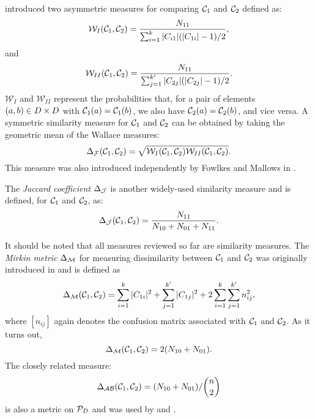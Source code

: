 \citet{wallace-1983} introduced two asymmetric measures for comparing
$\mathcal{C}_1$ and $\mathcal{C}_2$ defined as:
\begin{equation*}
  \mathcal{W}_{I}(\mathcal{C}_1,\mathcal{C}_2) =
  \frac{N_{11}}{\sum_{i=1}^{k} |C_{i1}|(|C_{1i}|-1)/2},
\end{equation*}
and
\begin{equation*}
  \mathcal{W}_{II}(\mathcal{C}_1,\mathcal{C}_2) =
  \frac{N_{11}}{\sum_{j=1}^{k'} |C_{2j}|(|C_{2j}|-1)/2}.
\end{equation*}
$\mathcal{W}_{I}$ and $\mathcal{W}_{II}$ represent the probabilities that, for
a pair of elements $(a,b) \in D \times D$ with
$\mathcal{C}_1(a)=\mathcal{C}_1(b)$, we also have $\mathcal{C}_2(a)=\mathcal{C}_2(b)$, and vice versa.
A symmetric similarity measure for $\mathcal{C}_1$ and $\mathcal{C}_2$ can be obtained by
taking the geometric mean of the Wallace measures:
\begin{equation*}
  \Delta_{\mathcal{F}}(\mathcal{C}_1,\mathcal{C}_2) = \sqrt{\mathcal{W}_{I}(\mathcal{C}_1,\mathcal{C}_2)
                          \mathcal{W}_{II}(\mathcal{C}_1,\mathcal{C}_2)}.
\end{equation*}
This measure was also introduced independently by Fowlkes and Mallows in
\citep{fowlkes-mallows-1983}.

The \textit{Jaccard coefficient} $\Delta_{\mathcal{J}}$ is another widely-used
similarity measure and is defined, for $\mathcal{C}_1$ and $\mathcal{C}_2$, as:
\begin{equation*}
  \Delta_{\mathcal{J}}(\mathcal{C}_1,\mathcal{C}_2) = \frac{N_{11}}{N_{10}+N_{01}+N_{11}}.
\end{equation*}

It should be noted that all measures reviewed so far are similarity measures.
The \textit{Mirkin metric} $\Delta_{\mathcal{M}}$ for measuring dissimilarity
between $\mathcal{C}_1$ and $\mathcal{C}_2$ was originally introduced in
\citep{mirkin1996mathematical} and is defined as
\begin{equation*}
  \Delta_{\mathcal{M}}(\mathcal{C}_1,\mathcal{C}_2) = \sum_{i=1}^{k} |C_{1i}|^2 +
                    \sum_{j=1}^{k'} |C_{1j}|^2 +
                    2\sum_{i=1}^{k}\sum_{j=1}^{k'} n_{ij}^2,
\end{equation*}
where $[n_{ij}]$ again denotes the confusion matrix associated with $\mathcal{C}_1$
and $\mathcal{C}_2$.  As it turns out, \[\Delta_{\mathcal{M}}(\mathcal{C}_1,\mathcal{C}_2)=2(N_{10}+N_{01}).\] The
closely related measure: \[\Delta_{\mathcal{AB}}(\mathcal{C}_1,\mathcal{C}_2)=(N_{10}+N_{01})/\binom{n}{2}\] is
also a metric on $\mathcal{P}_{D}$ and was used by
\citet{mirkin1970measurement} and \citet{arabie1973multidimensional}.

